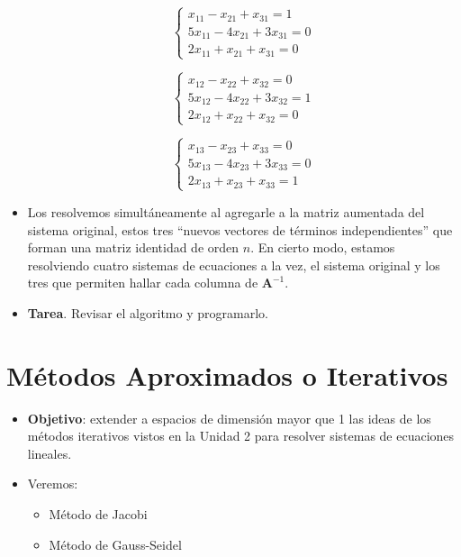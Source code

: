 \documentclass[openany]{book}
\providecommand{\tightlist}{%
  \setlength{\itemsep}{0pt}\setlength{\parskip}{0pt}}
\begin{document}
\begin{itemize}
  \[
    \begin{cases} 
    x_{11}-x_{21}+x_{31}=1 \\
    5x_{11}-4x_{21}+3x_{31}=0 \\
    2x_{11}+x_{21}+x_{31}=0
    \end{cases}
    \]

  \[
    \begin{cases} 
    x_{12}-x_{22}+x_{32}=0 \\
    5x_{12}-4x_{22}+3x_{32}=1 \\
    2x_{12}+x_{22}+x_{32}=0
    \end{cases}
    \]

  \[
    \begin{cases} 
    x_{13}-x_{23}+x_{33}=0 \\
    5x_{13}-4x_{23}+3x_{33}=0 \\
    2x_{13}+x_{23}+x_{33}=1
    \end{cases}
    \]
\item
  Los resolvemos simultáneamente al agregarle a la matriz aumentada del sistema original, estos tres ``nuevos vectores de términos independientes'' que forman una matriz identidad de orden \(n\). En cierto modo, estamos resolviendo cuatro sistemas de ecuaciones a la vez, el sistema original y los tres que permiten hallar cada columna de \(\mathbf{A}^{-1}\).
\item
  \textbf{Tarea}. Revisar el algoritmo y programarlo.
\end{itemize}

\hypertarget{muxe9todos-aproximados-o-iterativos}{%
\section{Métodos Aproximados o Iterativos}\label{muxe9todos-aproximados-o-iterativos}}

\begin{itemize}
\item
  \textbf{Objetivo}: extender a espacios de dimensión mayor que 1 las ideas de los métodos iterativos vistos en la Unidad 2 para resolver sistemas de ecuaciones lineales.
\item
  Veremos:

  \begin{itemize}
  \tightlist
  \item
    Método de Jacobi
  \item
    Método de Gauss-Seidel
  \end{itemize}
\end{itemize}
\end{document}
